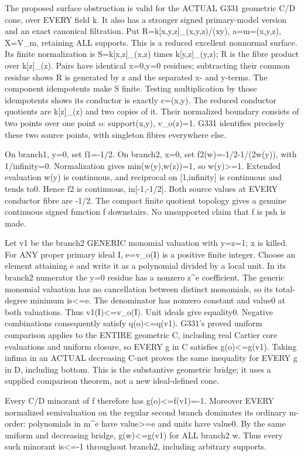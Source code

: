 \documentclass[11pt]{article}
\begin{document}
The proposed surface obstruction is valid for the ACTUAL G331 geometric C/D cone, over EVERY field k. It also has a stronger signed primary-model version and an exact canonical filtration. Put R=k[x,y,z]\_(x,y,z)/(xy), a=m=(x,y,z), X=V\_m, retaining ALL supports. This is a reduced excellent nonnormal surface. Its finite normalization is S=k[x,z]\_(x,z) times k[y,z]\_(y,z); R is the fibre product over k[z]\_(z). Pairs have identical x=0,y=0 residues; subtracting their common residue shows R is generated by z and the separated x- and y-terms. The component idempotents make S finite. Testing multiplication by those idempotents shows its conductor is exactly c=(x,y). The reduced conductor quotients are k[z]\_(z) and two copies of it. Their normalized boundary consists of two points over one point o: support(x,y), v\_o(z)=1. G331 identifies precisely these two source points, with singleton fibres everywhere else.

On branch1, y=0, set f1=-1/2. On branch2, x=0, set f2(w)=-1/2-1/(2w(y)), with 1/infinity=0. Normalization gives min(w(y),w(z))=1, so w(y)\textgreater{}=1. Extended evaluation w(y) is continuous, and reciprocal on [1,infinity] is continuous and tends to0. Hence f2 is continuous, in[-1,-1/2]. Both source values at EVERY conductor fibre are -1/2. The compact finite quotient topology gives a genuine continuous signed function f downstairs. No unsupported claim that f is psh is made.

Let v1 be the branch2 GENERIC monomial valuation with y=z=1; x is killed. For ANY proper primary ideal I, e=v\_o(I) is a positive finite integer. Choose an element attaining e and write it as a polynomial divided by a local unit. In its branch2 numerator the y=0 residue has a nonzero z\textasciicircum{}e coefficient. The generic monomial valuation has no cancellation between distinct monomials, so its total-degree minimum is\textless{}=e. The denominator has nonzero constant and value0 at both valuations. Thus v1(I)\textless{}=v\_o(I). Unit ideals give equality0. Negative combinations consequently satisfy q(o)\textless{}=q(v1). G331's proved uniform comparison applies to the ENTIRE geometric C, including real Cartier core evaluations and uniform closure, so EVERY g in C satisfies g(o)\textless{}=g(v1). Taking infima in an ACTUAL decreasing C-net proves the same inequality for EVERY g in D, including bottom. This is the substantive geometric bridge; it uses a supplied comparison theorem, not a new ideal-defined cone.

Every C/D minorant of f therefore has g(o)\textless{}=f(v1)=-1. Moreover EVERY normalized semivaluation on the regular second branch dominates its ordinary m-order: polynomials in m\textasciicircum{}e have value\textgreater{}=e and units have value0. By the same uniform and decreasing bridge, g(w)\textless{}=g(v1) for ALL branch2 w. Thus every such minorant is\textless{}=-1 throughout branch2, including arbitrary supports.
\end{document}
